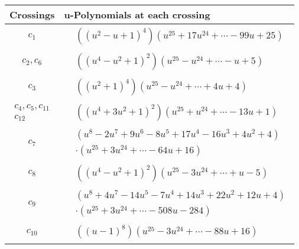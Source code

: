 \documentclass[1p]{elsarticle_modified}
\theoremstyle{definition}
\begin{document}
\begin{tabular}{m{50pt}|m{274pt}}
Crossings & \hspace{64pt}u-Polynomials at each crossing \\
\hline $$\begin{aligned}c_{1}\end{aligned}$$&$\begin{aligned}
&((u^2- u+1)^4)(u^{25}+17 u^{24}+\cdots-99 u+25)
\end{aligned}$\\
\hline $$\begin{aligned}c_{2},c_{6}\end{aligned}$$&$\begin{aligned}
&((u^4- u^2+1)^2)(u^{25}- u^{24}+\cdots- u+5)
\end{aligned}$\\
\hline $$\begin{aligned}c_{3}\end{aligned}$$&$\begin{aligned}
&((u^2+1)^4)(u^{25}- u^{24}+\cdots+4 u+4)
\end{aligned}$\\
\hline $$\begin{aligned}c_{4},c_{5},c_{11}\\c_{12}\end{aligned}$$&$\begin{aligned}
&((u^4+3 u^2+1)^2)(u^{25}+u^{24}+\cdots-13 u+1)
\end{aligned}$\\
\hline $$\begin{aligned}c_{7}\end{aligned}$$&$\begin{aligned}
&(u^8-2 u^7+9 u^6-8 u^5+17 u^4-16 u^3+4 u^2+4)\\
&\cdot(u^{25}+3 u^{24}+\cdots-64 u+16)
\end{aligned}$\\
\hline $$\begin{aligned}c_{8}\end{aligned}$$&$\begin{aligned}
&((u^4- u^2+1)^2)(u^{25}-3 u^{24}+\cdots+u-5)
\end{aligned}$\\
\hline $$\begin{aligned}c_{9}\end{aligned}$$&$\begin{aligned}
&(u^8+4 u^7-14 u^5-7 u^4+14 u^3+22 u^2+12 u+4)\\
&\cdot(u^{25}+3 u^{24}+\cdots-508 u-284)
\end{aligned}$\\
\hline $$\begin{aligned}c_{10}\end{aligned}$$&$\begin{aligned}
&((u-1)^8)(u^{25}-3 u^{24}+\cdots-88 u+16)
\end{aligned}$\\
\hline
\end{tabular}\newpage\renewcommand{\arraystretch}{1}
\end{document}
